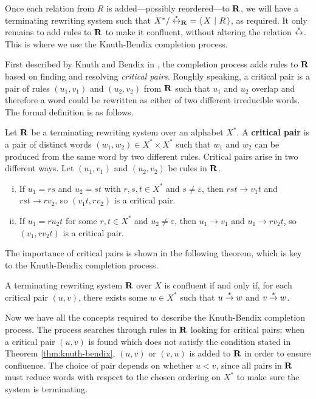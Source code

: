 Once each relation from $R$ is added---possibly reordered---to $\mathbf{R}$, we
will have a terminating rewriting system such that
$X^* / \stackrel{*}{\leftrightarrow}_{\mathbf{R}}\ = \left\langle\,X ~\middle|~ R\,\right\rangle$, as required.  It only remains to add
rules to $\mathbf{R}$ to make it confluent, without altering the relation
$\stackrel{*}{\leftrightarrow}$.  This is where we use the Knuth-Bendix completion process.

First described by Knuth and Bendix in \cite{knuth_bendix}, the completion
process adds rules to $\mathbf{R}$ based on finding and resolving
\textit{critical pairs}.  Roughly speaking, a critical pair is a pair of rules $(u_1, v_1)$ and
$(u_2, v_2)$ from $\mathbf{R}$ such that $u_1$ and $u_2$ overlap and therefore a word could be
rewritten as either of two different irreducible words.  The formal definition
is as follows.

\begin{definition}
  \label{def:critical-pair}
  Let $\mathbf{R}$ be a terminating rewriting system over an alphabet $X^*$.  A
  \textbf{critical pair} is a pair of distinct words
  $(w_1, w_2) \in X^* \times X^*$ such that $w_1$ and $w_2$ can be produced from
  the same word by two different rules.
  Critical pairs arise in two different ways.
  Let $(u_1, v_1)$ and $(u_2, v_2)$ be rules in $\mathbf{R}$.
  \begin{enumerate}[(i)]
  \item If $u_1 = rs$ and $u_2 = st$ with $r,s,t \in X^*$ and
    $s \neq \varepsilon$, then $rst \to v_1t$ and $rst \to rv_2$, so
    $(v_1t, rv_2)$ is a critical pair.
  \item If $u_1 = ru_2t$ for some $r,t \in X^*$ and $u_2 \neq \varepsilon$, then
    $u_1 \to v_1$ and $u_1 \to rv_2t$, so $(v_1, rv_2t)$ is a critical
    pair.
  \end{enumerate}
\end{definition}

The importance of critical pairs is shown in the following theorem, which is key
to the Knuth-Bendix completion process.

\begin{theorem}
  \label{thm:knuth-bendix}
  A terminating rewriting system $\mathbf{R}$ over $X$ is confluent if and only if,
  for each critical pair $(u, v)$, there exists some $w \in X^*$ such that
  $u \stackrel{*}{\to} w$ and $v \stackrel{*}{\to} w$.
\end{theorem}

Now we have all the concepts required to describe the Knuth-Bendix completion
process.  The process searches through rules in $\mathbf{R}$ looking for critical
pairs; when a critical pair $(u, v)$ is found which does not satisfy the
condition stated in Theorem \ref{thm:knuth-bendix}, $(u, v)$ or $(v, u)$ is
added to $\mathbf{R}$ in order to ensure confluence.  The choice of pair depends on
whether $u < v$, since all pairs in $\mathbf{R}$ must reduce words with respect to the
chosen ordering on $X^*$ to make sure the system is terminating.

